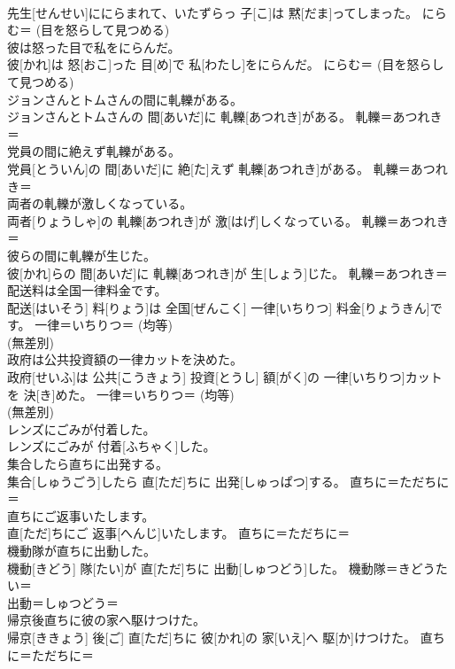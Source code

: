 \documentclass[8pt]{extreport}
\begin{document}
\begin{CJK}{UTF8}{min}
\\	先生[せんせい]ににらまれて、いたずらっ 子[こ]は 黙[だま]ってしまった。	にらむ＝ (目を怒らして見つめる) 
\\	彼は怒った目で私をにらんだ。	
\\	彼[かれ]は 怒[おこ]った 目[め]で 私[わたし]をにらんだ。	にらむ＝ (目を怒らして見つめる) 
\\	ジョンさんとトムさんの間に軋轢がある。	
\\	ジョンさんとトムさんの 間[あいだ]に 軋轢[あつれき]がある。	軋轢＝あつれき＝ 
\\	党員の間に絶えず軋轢がある。	
\\	党員[とういん]の 間[あいだ]に 絶[た]えず 軋轢[あつれき]がある。	軋轢＝あつれき＝ 
\\	両者の軋轢が激しくなっている。	
\\	両者[りょうしゃ]の 軋轢[あつれき]が 激[はげ]しくなっている。	軋轢＝あつれき＝ 
\\	彼らの間に軋轢が生じた。	
\\	彼[かれ]らの 間[あいだ]に 軋轢[あつれき]が 生[しょう]じた。	軋轢＝あつれき＝ 
\\	配送料は全国一律料金です。	
\\	配送[はいそう] 料[りょう]は 全国[ぜんこく] 一律[いちりつ] 料金[りょうきん]です。	一律＝いちりつ＝ (均等) 
\\	(無差別)
\\	政府は公共投資額の一律カットを決めた。	
\\	政府[せいふ]は 公共[こうきょう] 投資[とうし] 額[がく]の 一律[いちりつ]カットを 決[き]めた。	一律＝いちりつ＝ (均等) 
\\	(無差別)
\\	レンズにごみが付着した。	
\\	レンズにごみが 付着[ふちゃく]した。	
\\	集合したら直ちに出発する。	
\\	集合[しゅうごう]したら 直[ただ]ちに 出発[しゅっぱつ]する。	直ちに＝ただちに＝ 
\\	直ちにご返事いたします。	
\\	直[ただ]ちにご 返事[へんじ]いたします。	直ちに＝ただちに＝ 
\\	機動隊が直ちに出動した。	
\\	機動[きどう] 隊[たい]が 直[ただ]ちに 出動[しゅつどう]した。	機動隊＝きどうたい＝ 
\\	出動＝しゅつどう＝ 
\\	帰京後直ちに彼の家へ駆けつけた。	
\\	帰京[ききょう] 後[ご] 直[ただ]ちに 彼[かれ]の 家[いえ]へ 駆[か]けつけた。	直ちに＝ただちに＝ 

\end{CJK}
\end{document}
